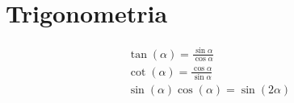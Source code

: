 \section{Trigonometria}
\begin{gather*}
 \tan (\alpha) = \frac{\sin \alpha}{\cos \alpha} \\
 \cot (\alpha) = \frac{\cos \alpha}{\sin \alpha} \\
 \sin (\alpha) \cos (\alpha) = \sin (2 \alpha)
\end{gather*}